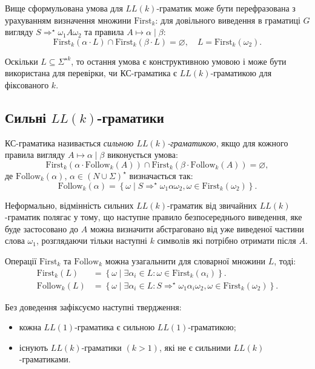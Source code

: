 Вище сформульована умова для $LL(k)$-граматик може бути перефразована з урахуванням визначення множини $\text{First}_k$: для довільного виведення в граматиці $G$ вигляду $S \Rightarrow^\star \omega_1 A \omega_2$ та правила $A \mapsto \alpha \mid \beta$:
\[\text{First}_k(\alpha \cdot L) \cap \text{First}_k (\beta \cdot L) = \varnothing, \quad L = \text{First}_k(\omega_2).\]

Оскільки $L \subseteq \Sigma^{\star k}$, то остання умова є конструктивною умовою і може бути використана для перевірки, чи КС-граматика є $LL(k)$-граматикою для фіксованого $k$.

\subsection{Сильні $LL(k)$-граматики}

КС-граматика називається \textit{сильною $LL(k)$-граматикою}, якщо для кожного правила вигляду $A \mapsto \alpha \mid \beta$ виконується умова: \[\text{First}_k (\alpha \cdot \text{Follow}_k (A)) \cap \text{First}_k (\beta \cdot \text{Follow}_k (A)) = \varnothing,\] де $\text{Follow}_k(\alpha)$, $\alpha \in (N \cup \Sigma)^\star$ визначається так: \[\text{Follow}_k (\alpha) = \left\{ \omega \mid S \Rightarrow^\star \omega_1 \alpha \omega_2, \omega \in \text{First}_k(\omega_2) \right\}.\]

Неформально, відмінність сильних $LL(k)$-граматик від звичайних $LL(k)$-граматик полягає у тому, що наступне правило безпосереднього виведення, яке буде застосовано до $A$ можна визначити абстраговано від уже виведеної частини слова $\omega_1$, розглядаючи тільки наступні $k$ символів які потрібно отримати після $A$. \medskip

Операції $\text{First}_k$ та $\text{Follow}_k$ можна узагальнити для словарної множини $L$, тоді:
\begin{align*}
	\text{First}_k (L) &= \left\{ \omega \mid \exists \alpha_i \in L: \omega \in \text{First}_k (\alpha_i) \right\}. \\
	\text{Follow}_k (L) &= \left\{ \omega \mid \exists \alpha_i \in L: S \Rightarrow^\star \omega_1 \alpha_i \omega_2, \omega \in \text{First}_k (\omega_2) \right\}.
\end{align*}

Без доведення зафіксуємо наступні твердження:
\begin{itemize}
	\item кожна $LL(1)$-граматика є сильною $LL(1)$-граматикою;
	\item існують $LL(k)$-граматики $(k > 1)$, які не є сильними $LL(k)$-граматиками.
\end{itemize}

